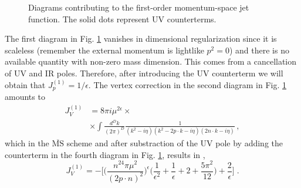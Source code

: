 \documentclass[%
 reprint,
 amsmath,amssymb,
 aps,
]{revtex4-1}
\begin{document}
\begin{figure}[ht!]
\;\;\;\;\;\;\;\;\;\;\;
\caption{Diagrams contributing to the first-order momentum-space jet function. The solid dots represent UV counterterms.}\label{jetff}
\end{figure}

The first diagram in Fig. \ref{jetff} vanishes in dimensional regularization since it is scaleless  (remember the external momentum is lightlike $p^2=0$) and there is no available quantity with non-zero mass dimension. This comes from a cancellation of UV and IR poles. Therefore, after introducing the UV counterterm we will obtain that $J_p^{(1)}=1/\epsilon$. The vertex correction in the second diagram in Fig. \ref{jetff} amounts to
\begin{align}
J_V^{(1)}&=8\pi i\mu^{2\epsilon}\times\nonumber\\ 
&\times\int\frac{d^Dk}{(2\pi)^D}\frac{1}{(k^2-i\eta)(k^2-2p\cdot k-i\eta)(2n\cdot k-i\eta)}\,,
\end{align}
which in the $\overline{\text{MS}}$ scheme and after substraction of the UV pole by adding the counterterm in the fourth diagram in Fig. \ref{jetff},
 results in \cite{Bonoc},
\begin{equation}
J_V^{(1)}=-\Big[\Big(\frac{n^24\pi\mu^2}{(2p\cdot n)^2}\Big)^\epsilon\Big(\frac{1}{\epsilon^2}+\frac{1}{\epsilon}+2+\frac{5\pi^2}{12}\Big)+\frac{2}{\epsilon}\Big]\;.\label{biblioroneo}
\end{equation}

 
\end{document}
